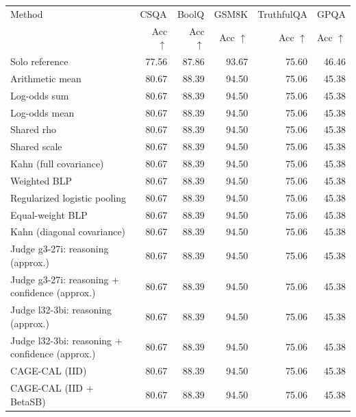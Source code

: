 \begin{tabular}{lrrrrr}
\toprule
Method & \multicolumn{1}{c}{CSQA} & \multicolumn{1}{c}{BoolQ} & \multicolumn{1}{c}{GSM8K} & \multicolumn{1}{c}{TruthfulQA} & \multicolumn{1}{c}{GPQA} \\
 & Acc $\uparrow$ & Acc $\uparrow$ & Acc $\uparrow$ & Acc $\uparrow$ & Acc $\uparrow$ \\
\midrule
Solo reference & 77.56 & 87.86 & 93.67 & 75.60 & 46.46 \\
Arithmetic mean & 80.67 & 88.39 & 94.50 & 75.06 & 45.38 \\
Log-odds sum & 80.67 & 88.39 & 94.50 & 75.06 & 45.38 \\
Log-odds mean & 80.67 & 88.39 & 94.50 & 75.06 & 45.38 \\
Shared rho & 80.67 & 88.39 & 94.50 & 75.06 & 45.38 \\
Shared scale & 80.67 & 88.39 & 94.50 & 75.06 & 45.38 \\
Kahn (full covariance) & 80.67 & 88.39 & 94.50 & 75.06 & 45.38 \\
Weighted BLP & 80.67 & 88.39 & 94.50 & 75.06 & 45.38 \\
Regularized logistic pooling & 80.67 & 88.39 & 94.50 & 75.06 & 45.38 \\
Equal-weight BLP & 80.67 & 88.39 & 94.50 & 75.06 & 45.38 \\
Kahn (diagonal covariance) & 80.67 & 88.39 & 94.50 & 75.06 & 45.38 \\
Judge g3-27i: reasoning (approx.) & 80.67 & 88.39 & 94.50 & 75.06 & 45.38 \\
Judge g3-27i: reasoning + confidence (approx.) & 80.67 & 88.39 & 94.50 & 75.06 & 45.38 \\
Judge l32-3bi: reasoning (approx.) & 80.67 & 88.39 & 94.50 & 75.06 & 45.38 \\
Judge l32-3bi: reasoning + confidence (approx.) & 80.67 & 88.39 & 94.50 & 75.06 & 45.38 \\
CAGE-CAL (IID) & 80.67 & 88.39 & 94.50 & 75.06 & 45.38 \\
CAGE-CAL (IID + BetaSB) & 80.67 & 88.39 & 94.50 & 75.06 & 45.38 \\
\bottomrule
\end{tabular}
